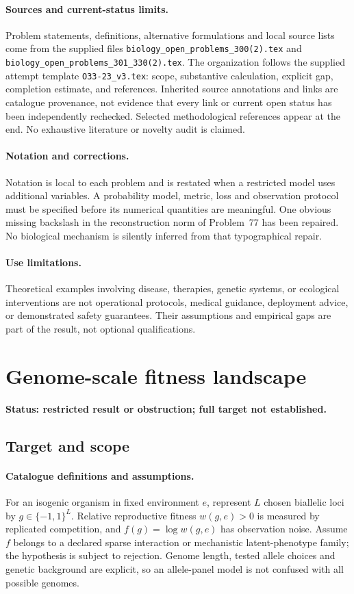 \documentclass[11pt]{article}
\begin{document}
\paragraph{Sources and current-status limits.}
Problem statements, definitions, alternative formulations and local source lists
come from the supplied files
\texttt{biology\_open\_problems\_300(2).tex} and
\texttt{biology\_open\_problems\_301\_330(2).tex}.
The organization follows the supplied attempt template
\texttt{O33-23\_v3.tex}: scope, substantive calculation, explicit gap,
completion estimate, and references. Inherited source annotations and links are
catalogue provenance, not evidence that every link or current open status has
been independently rechecked. Selected methodological references appear at the
end. No exhaustive literature or novelty audit is claimed.

\paragraph{Notation and corrections.}
Notation is local to each problem and is restated when a restricted model uses
additional variables. A probability model, metric, loss and observation protocol
must be specified before its numerical quantities are meaningful. One obvious
missing backslash in the reconstruction norm of Problem~77 has been repaired.
No biological mechanism is silently inferred from that typographical repair.

\paragraph{Use limitations.}
Theoretical examples involving disease, therapies, genetic systems, or ecological
interventions are not operational protocols, medical guidance, deployment advice,
or demonstrated safety guarantees. Their assumptions and empirical gaps are part
of the result, not optional qualifications.


\section*{Genome-scale fitness landscape}
\label{prob:142}
\noindent\textbf{Status: restricted result or obstruction; full target not established.}
\subsection{Target and scope}
\paragraph{Catalogue definitions and assumptions.}
For an isogenic organism in fixed environment $e$, represent $L$ chosen biallelic loci by $g\in\{-1,1\}^L$. Relative reproductive fitness $w(g,e)>0$ is measured by replicated competition, and $f(g)=\log w(g,e)$ has observation noise. Assume $f$ belongs to a declared sparse interaction or mechanistic latent-phenotype family; the hypothesis is subject to rejection. Genome length, tested allele choices and genetic background are explicit, so an allele-panel model is not confused with all possible genomes.
\end{document}
